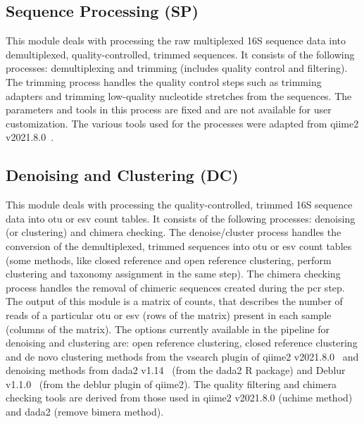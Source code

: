   \subsection*{Sequence Processing (SP)}
  This module deals with processing the raw multiplexed 16S sequence data into demultiplexed, quality-controlled, trimmed sequences.
  It consists of the following processes: demultiplexing and trimming (includes quality control and filtering).
  The trimming process handles the quality control steps such as trimming adapters and trimming low-quality nucleotide stretches from the sequences.
  The parameters and tools in this process are fixed and are not available for user customization.
  The various tools used for the processes were adapted from \ac{qiime2} v2021.8.0~\cite{bolyenReproducibleInteractiveScalable2019}.

  \subsection*{Denoising and Clustering (DC)}
  \vspace{-5mm}
  This module deals with processing the quality-controlled, trimmed 16S sequence data into \ac{otu} or \ac{esv} count tables.
  It consists of the following processes: denoising (or clustering) and chimera checking.
  The denoise/cluster process handles the conversion of the demultiplexed, trimmed sequences into \ac{otu} or \ac{esv} count tables (some methods, like closed reference and open reference clustering, perform clustering and taxonomy assignment in the same step).
  The chimera checking process handles the removal of chimeric sequences created during the \ac{pcr} step.
  The output of this module is a matrix of counts, that describes the number of reads of a particular \ac{otu} or \ac{esv} (rows of the matrix) present in each sample (columns of the matrix).
  The options currently available in the pipeline for denoising and clustering are: open reference clustering, closed reference clustering and de novo clustering methods from the vsearch plugin of \ac{qiime2} v2021.8.0~\cite{bolyenReproducibleInteractiveScalable2019} and denoising methods from \ac{dada2} v1.14~\cite{Callahan2016} (from the \ac{dada2} R package) and Deblur v1.1.0~\cite{Amir2017} (from the deblur plugin of \ac{qiime2}).
  The quality filtering and chimera checking tools are derived from those used in \ac{qiime2} v2021.8.0 (uchime method) and \ac{dada2} (remove bimera method).

